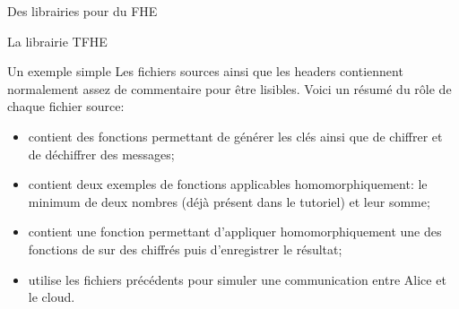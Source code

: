 \begin{section}{Des librairies pour du FHE}
\begin{subsection}{La librairie TFHE}
\begin{subsubsection}{Un exemple simple}
Les fichiers sources ainsi que les headers contiennent normalement assez de
commentaire pour être lisibles. Voici un résumé du rôle de chaque fichier source:
\begin{itemize}
\item {} contient des fonctions permettant de générer les
clés ainsi que de chiffrer et de déchiffrer des messages;
\item {} contient deux exemples de fonctions 
applicables homomorphiquement: le minimum de deux nombres (déjà 
présent dans le tutoriel) et leur somme;
\item {} contient une fonction permettant d'appliquer 
homomorphiquement une des fonctions de 
sur des chiffrés puis d'enregistrer le résultat;
\item {} utilise les fichiers précédents
	pour simuler une communication entre Alice et le cloud.
\end{itemize}


	
\end{subsubsection} %
\end{subsection} %
\end{section}
